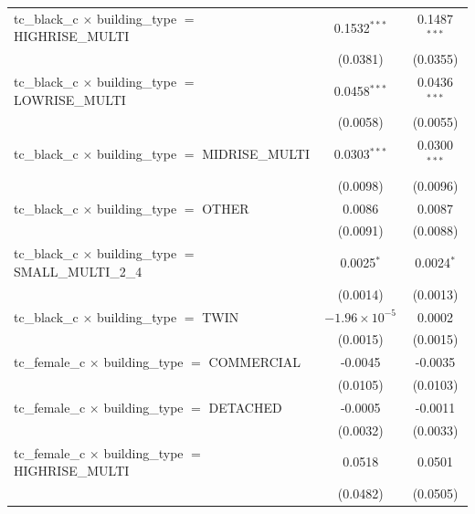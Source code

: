 \begin{tabular}{lcc}
   tc\_black\_c $\times$ building\_type $=$ HIGHRISE\_MULTI            & 0.1532$^{***}$         & 0.1487$^{***}$\\   
                                                                       & (0.0381)               & (0.0355)\\   
   tc\_black\_c $\times$ building\_type $=$ LOWRISE\_MULTI             & 0.0458$^{***}$         & 0.0436$^{***}$\\   
                                                                       & (0.0058)               & (0.0055)\\   
   tc\_black\_c $\times$ building\_type $=$ MIDRISE\_MULTI             & 0.0303$^{***}$         & 0.0300$^{***}$\\   
                                                                       & (0.0098)               & (0.0096)\\   
   tc\_black\_c $\times$ building\_type $=$ OTHER                      & 0.0086                 & 0.0087\\   
                                                                       & (0.0091)               & (0.0088)\\   
   tc\_black\_c $\times$ building\_type $=$ SMALL\_MULTI\_2\_4         & 0.0025$^{*}$           & 0.0024$^{*}$\\   
                                                                       & (0.0014)               & (0.0013)\\   
   tc\_black\_c $\times$ building\_type $=$ TWIN                       & $-1.96\times 10^{-5}$  & 0.0002\\   
                                                                       & (0.0015)               & (0.0015)\\   
   tc\_female\_c $\times$ building\_type $=$ COMMERCIAL                & -0.0045                & -0.0035\\   
                                                                       & (0.0105)               & (0.0103)\\   
   tc\_female\_c $\times$ building\_type $=$ DETACHED                  & -0.0005                & -0.0011\\   
                                                                       & (0.0032)               & (0.0033)\\   
   tc\_female\_c $\times$ building\_type $=$ HIGHRISE\_MULTI           & 0.0518                 & 0.0501\\   
                                                                       & (0.0482)               & (0.0505)\\   

\end{tabular}
